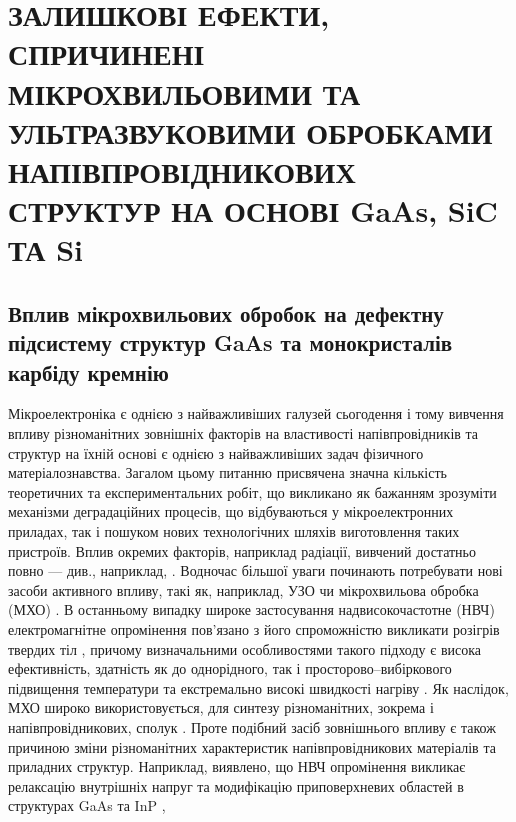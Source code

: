 
\chapter{\MakeUppercase{Залишкові ефекти, спричинені мікрохвильовими та ультразвуковими обробками напівпровідникових структур на основі} GaAs, SiC ТА Si\label{Ch_UST_MW}}

\section{Вплив мікрохвильових обробок на дефектну підсистему структур GaAs та монокристалів карбіду кремнію}

Мікроелектроніка є однією з найважливіших галузей сьогодення і тому
вивчення впливу різноманітних зовнішніх факторів на властивості напівпровідників та структур на їхній основі є однією з найважливіших задач фізичного матеріалознавства.
Загалом цьому питанню присвячена значна кількість теоретичних та експериментальних робіт,
що викликано як бажанням зрозуміти механізми деградаційних процесів, що відбуваються у мікроелектронних приладах,
так і пошуком нових технологічних шляхів виготовлення таких пристроїв.
Вплив окремих факторів, наприклад радіації, вивчений достатньо повно --- див., наприклад, \cite{KorshunovBook,Kozlovs}.
Водночас більшої уваги починають потребувати нові засоби активного впливу, такі як, наприклад, УЗО чи мікрохвильова обробка (МХО) \cite{MW:Rev,Rjanov1981,paton1993,Vinnik1989,ZOHM2000,BHUNIA1998,Bacherikov2003r,Pashkov1994r,
Boltovets,Kr1996,Milenin1994,BelyaevIntac,ASHKINADZE1996,ProcSPIE,Venger1999,Belyaev1998JTFr,
Bacherikov2008,Konakova2015,Konakova2012FTP}.
В останньому випадку широке застосування надвисокочастотне (НВЧ) електромагнітне опромінення пов'язано
  з його спроможністю викликати розігрів твердих тіл \cite{MW:Rev,ZOHM2000,paton1993}, причому визначальними особливостями такого підходу є висока ефективність, здатність як до однорідного, так і просторово--вибіркового підвищення температури та екстремально високі швидкості нагріву \cite{MW:Rev}.
Як наслідок, МХО широко використовується, для синтезу різноманітних, зокрема і напівпровідникових, сполук \cite{MW:Rev,BHUNIA1998}.
Проте подібний засіб зовнішнього впливу є також причиною зміни різноманітних характеристик напівпровідникових матеріалів та приладних структур.
Наприклад, виявлено, що НВЧ опромінення викликає релаксацію внутрішніх напруг та модифікацію приповерхневих
областей в структурах GaAs та InP \cite{Boltovets,Pashkov1994r,Kr1996,Milenin1994,BelyaevIntac,ProcSPIE,Venger1999,Konakova2015,Konakova2012FTP},
